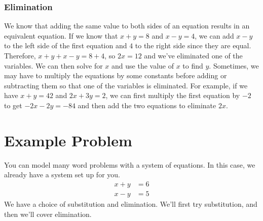 \documentclass{article}
\begin{document}
    \subsubsection*{Elimination}
    We know that adding the same value to both sides of an equation results in an equivalent equation.
    If we know that $x + y = 8$ and $x - y = 4$, we can add $x - y$ to the left side of the first equation and $4$ to the right side since they are equal.
    Therefore, $x + y + x - y = 8 + 4$, so $2x = 12$ and we've eliminated one of the variables.
    We can then solve for $x$ and use the value of $x$ to find $y$.
    Sometimes, we may have to multiply the equations by some constants before adding or subtracting them so that one of the variables is eliminated.
    For example, if we have $x + y = 42$ and $2x + 3y = 2$, we can first multiply the first equation by $-2$ to get $-2x - 2y = -84$ and then add the two equations to eliminate $2x$.

    \section*{Example Problem}
    You can model many word problems with a system of equations.
    In this case, we already have a system set up for you.
    \begin{align}
        x + y &= 6 \label{eq1} \\
        x - y &= 5 \label{eq2}
    \end{align}
    We have a choice of substitution and elimination.
    We'll first try substitution, and then we'll cover elimination.
    
\end{document}
